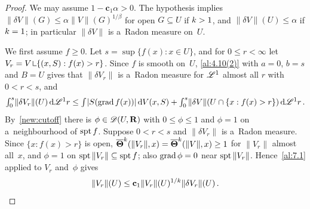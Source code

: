 \begin{proof}
    We may assume $1 - \mathbf{c}_1 \alpha > 0$. The hypothesis implies $\|\delta V\|(G) \le \alpha
    \|V\|(G)^{1/\beta}$ for open $G \subseteq U$ if $k > 1$, and $\|\delta V\|(U) \le \alpha$ if
    $k = 1$; in particular $\|\delta V\|$ is a~Radon measure on~$U$.

    We first assume $f \ge 0$. Let $s = \sup \{ f(x) : x \in U \}$, and for $0 \le r < \infty$ let $V_r
    = V \restrict \{ (x,S) : f(x) > r \}$. Since $f$ is smooth on~$U$, \ref{al:4.10(2)} with $a = 0$,
    $b = s$ and $B = U$ gives that $\|\delta V_r\|$ is a~Radon measure for $\mathscr{L}^1$ almost all $r$
    with $0 < r < s$, and
    \begin{equation}
        \label{eq:7.3:1}
        {\textstyle\int_{0}^{s}} \|\delta V_r\|(U) \,\mathrm{d} \mathscr{L}^1 r \le {\textstyle\int_{}^{}} |S(\operatorname{grad} f(x))| \,\mathrm{d} V(x,S) +
        {\textstyle\int_{0}^{s}} \|\delta V\|(U \cap \{ x : f(x) > r \}) \,\mathrm{d} \mathscr{L}^1 r \,.
    \end{equation}
    By~\ref{new:cutoff} there is $\phi \in \mathscr{D}(U,\mathbf{R})$ with $0 \le \phi \le 1$ and $\phi = 1$
    on a~neighbourhood of $\operatorname{spt} f$. Suppose $0 < r < s$ and $\|\delta V_r\|$ is a~Radon measure.
    Since $\{ x : f(x) > r \}$ is open, $\boldsymbol{\overline{\Theta}}^{k}(\|V_r\|,x) = \boldsymbol{\overline{\Theta}}^{k}(\|V\|,x)
    \ge 1$ for $\|V_r\|$ almost all~$x$, and $\phi = 1$ on $\operatorname{spt} \|V_r\| \subseteq \operatorname{spt} f$; also
    $\operatorname{grad} \phi = 0$ near $\operatorname{spt} \|V_r\|$. Hence~\ref{al:7.1} applied to $V_r$ and~$\phi$ gives
    \begin{equation}
        \label{eq:7.3:2}
        \|V_r\|(U) \le \mathbf{c}_1 \|V_r\|(U)^{1/k} \|\delta V_r\|(U) \,.
    \end{equation}


\end{proof}
